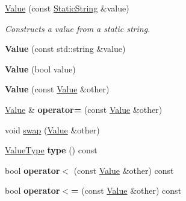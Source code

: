 \begin{DoxyCompactItemize}
\item 
\hyperlink{class_json_1_1_value_a081830e95f88a37054da7e46c65b0766}{Value} (const \hyperlink{class_json_1_1_static_string}{Static\-String} \&value)
\begin{DoxyCompactList}\small\item\em Constructs a value from a static string. \end{DoxyCompactList}\item 
\hypertarget{class_json_1_1_value_aa4501dd4edf3ce3d5145fc656f088b21}{{\bfseries Value} (const std\-::string \&value)}\label{class_json_1_1_value_aa4501dd4edf3ce3d5145fc656f088b21}

\item 
\hypertarget{class_json_1_1_value_a350a31ea4a30d384994b0bc010b17495}{{\bfseries Value} (bool value)}\label{class_json_1_1_value_a350a31ea4a30d384994b0bc010b17495}

\item 
\hypertarget{class_json_1_1_value_a436dfd3670f95fd665f680eba5cebcf0}{{\bfseries Value} (const \hyperlink{class_json_1_1_value}{Value} \&other)}\label{class_json_1_1_value_a436dfd3670f95fd665f680eba5cebcf0}

\item 
\hypertarget{class_json_1_1_value_ade21ab9710b64fee954b5fcceb0d37dd}{\hyperlink{class_json_1_1_value}{Value} \& {\bfseries operator=} (const \hyperlink{class_json_1_1_value}{Value} \&other)}\label{class_json_1_1_value_ade21ab9710b64fee954b5fcceb0d37dd}

\item 
void \hyperlink{class_json_1_1_value_aab841120d78e296e1bc06a373345e822}{swap} (\hyperlink{class_json_1_1_value}{Value} \&other)
\item 
\hypertarget{class_json_1_1_value_a695ef31fad36b4712918b3ff80158479}{\hyperlink{namespace_json_a7d654b75c16a57007925868e38212b4e}{Value\-Type} {\bfseries type} () const }\label{class_json_1_1_value_a695ef31fad36b4712918b3ff80158479}

\item 
\hypertarget{class_json_1_1_value_af0ad8aa027575c3277296458f3fb7b0a}{bool {\bfseries operator$<$} (const \hyperlink{class_json_1_1_value}{Value} \&other) const }\label{class_json_1_1_value_af0ad8aa027575c3277296458f3fb7b0a}

\item 
\hypertarget{class_json_1_1_value_afb99dd3628fe44244b32007f9b4f369a}{bool {\bfseries operator$<$=} (const \hyperlink{class_json_1_1_value}{Value} \&other) const }\label{class_json_1_1_value_afb99dd3628fe44244b32007f9b4f369a}


\end{DoxyCompactItemize}
